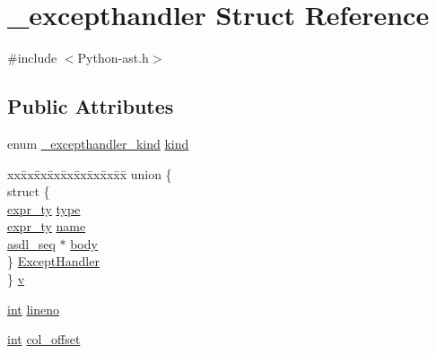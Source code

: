 \hypertarget{struct__excepthandler}{}\section{\+\_\+excepthandler Struct Reference}
\label{struct__excepthandler}


{\ttfamily \#include $<$Python-\/ast.\+h$>$}

\subsection*{Public Attributes}
\begin{DoxyCompactItemize}
\item 
enum \mbox{\hyperlink{_python-ast_8h_ab1a02e0128d053979abf2a94cf6ca9f2}{\+\_\+excepthandler\+\_\+kind}} \mbox{\hyperlink{struct__excepthandler_a4b560643cf632a1a95ad8233043fa642}{kind}}
\item 
\begin{tabbing}
xx\=xx\=xx\=xx\=xx\=xx\=xx\=xx\=xx\=\kill
union \{\\
\>struct \{\\
\>\>\mbox{\hyperlink{_python-ast_8h_a56d3705e020a071405094a220c4592bd}{expr\_ty}} \mbox{\hyperlink{struct__excepthandler_a71d56e01ee76537a4165e0318206d562}{type}}\\
\>\>\mbox{\hyperlink{_python-ast_8h_a56d3705e020a071405094a220c4592bd}{expr\_ty}} \mbox{\hyperlink{struct__excepthandler_aebea8c76989a2c2750bb709c58c3d1b4}{name}}\\
\>\>\mbox{\hyperlink{structasdl__seq}{asdl\_seq}} $\ast$ \mbox{\hyperlink{struct__excepthandler_aa83f83cb180be8878f41a9b9765a77d8}{body}}\\
\>\} \mbox{\hyperlink{struct__excepthandler_acf1dbe3a5c471b2488219a0ce9364d77}{ExceptHandler}}\\
\} \mbox{\hyperlink{struct__excepthandler_a9bf0c98d77da53e277fd43658981672d}{v}}\\

\end{tabbing}\item 
\mbox{\hyperlink{warnings_8h_a74f207b5aa4ba51c3a2ad59b219a423b}{int}} \mbox{\hyperlink{struct__excepthandler_af779ad209161de4fa7e27838cc5f7fa3}{lineno}}
\item 
\mbox{\hyperlink{warnings_8h_a74f207b5aa4ba51c3a2ad59b219a423b}{int}} \mbox{\hyperlink{struct__excepthandler_a418f55219dd2c9a2871ec62133d11b8f}{col\+\_\+offset}}
\end{DoxyCompactItemize}



